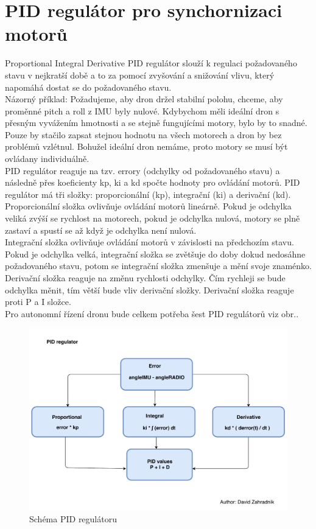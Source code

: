 \section{PID regulátor pro synchornizaci motorů} 
Proportional Integral Derivative
PID regulátor slouží k regulaci požadovaného stavu v nejkratší době a to za pomocí zvyšování a snižování vlivu, který napomáhá dostat se do požadovaného stavu.\\
Názorný příklad:
Požadujeme, aby dron držel stabilní polohu, chceme, aby proměnné pitch a roll z IMU byly nulové. Kdybychom měli ideální dron s přesným vyvážením hmotnosti a se stejně fungujícími motory, bylo by to snadné. Pouze by stačilo zapsat stejnou hodnotu na všech motorech a dron by bez problémů vzlétnul. Bohužel ideální dron nemáme, proto motory se musí být ovládany individuálně.\\
PID regulátor reaguje na tzv. errory (odchylky od požadovaného stavu) a následně přes koeficienty kp, ki a kd spočte hodnoty pro ovládání motorů.
PID regulátor má tři složky: proporcionální (kp), integrační (ki) a derivační (kd).\\
Proporcionální složka ovlivňuje ovládání motorů lineárně. Pokud je odchylka veliká zvýší se rychlost na motorech, pokud je odchylka nulová, motory se plně zastaví a spustí se až když je odchylka není nulová.\\
Integrační složka ovlivňuje ovládání motorů v závislosti na předchozím stavu. Pokud je odchylka velká, integrační složka se zvětšuje do doby dokud nedosáhne požadovaného stavu, potom se integrační složka zmenšuje a mění svoje znaménko.\\
Derivační složka reaguje na změnu rychlosti odchylky. Čím rychleji se bude odchylka měnit, tím větší bude vliv derivační složky. Derivační složka reaguje proti P a I složce.\\
Pro autonomní řízení dronu bude celkem potřeba šest PID regulátorů viz obr..\\
\newpage
\begin{figure}[h]
	\centering
	\includegraphics[width=15cm]{pictures/PIDDiagram.pdf}
	\caption{Schéma PID regulátoru}
\end{figure}

